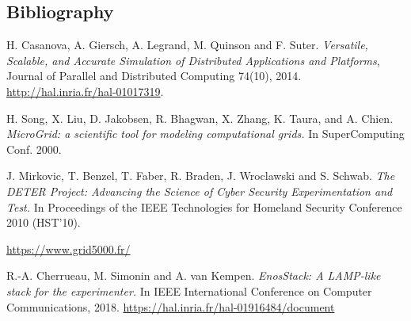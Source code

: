 \documentclass[a4paper,11pt]{article}
\begin{document}
\subsection*{Bibliography}
\begin{compactitem}
\item H. Casanova, A. Giersch, A. Legrand, M.  Quinson and F. Suter.
  \textit{Versatile, Scalable, and Accurate Simulation of Distributed
    Applications and Platforms}, Journal of Parallel and Distributed Computing
  74(10), 2014. \url{http://hal.inria.fr/hal-01017319}.
\item H. Song, X. Liu, D. Jakobsen, R. Bhagwan, X. Zhang, K. Taura,
  and A. Chien. \textit{MicroGrid: a scientific tool for modeling
    computational grids.} In SuperComputing Conf. 2000.
\item J. Mirkovic, T. Benzel, T.  Faber, R. Braden, J. Wroclawski and
  S. Schwab. \textit{The DETER Project: Advancing the Science of Cyber
    Security Experimentation and Test.}  In Proceedings of the IEEE
  Technologies for Homeland Security Conference 2010 (HST'10).
\item \url{https://www.grid5000.fr/}
\item R.-A. Cherrueau, M. Simonin and A. van Kempen.
  \textit{EnosStack: A LAMP-like stack for the experimenter.}  In IEEE
  International Conference on Computer Communications,
  2018. \url{https://hal.inria.fr/hal-01916484/document}

\end{compactitem}
\end{document}
